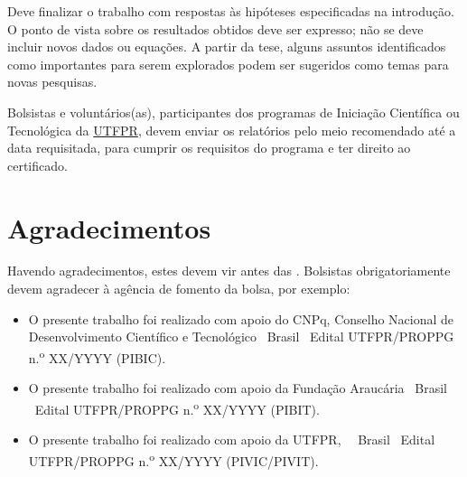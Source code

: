 \documentclass[%
  a4paper,%
  12pt,%
  fleqn,%
  english,%
  brazilian,%
]{article}
\begin{document}
Deve finalizar o trabalho com respostas às hipóteses especificadas na introdução.
O ponto de vista sobre os resultados obtidos deve ser expresso; não se deve incluir novos dados ou equações.
A partir da tese, alguns assuntos identificados como importantes para serem explorados podem ser sugeridos como temas para novas pesquisas.

Bolsistas e voluntários{(as)}, participantes dos programas de Iniciação Científica ou Tecnológica da \href{https://www.utfpr.edu.br/}{UTFPR\LinkIcon}, devem enviar os relatórios pelo meio recomendado até a data requisitada, para cumprir os requisitos do programa e ter direito ao certificado.

\section{Agradecimentos}%
\label{sect:ack}

Havendo agradecimentos, estes devem vir antes das .
Bolsistas obrigatoriamente devem agradecer à agência de fomento da bolsa, por exemplo:

\begin{itemize}
\item O presente trabalho foi realizado com apoio do CNPq, Conselho Nacional de Desenvolvimento Científico e Tecnológico \textemdash\ Brasil \textemdash\ Edital UTFPR/PROPPG n.\textsuperscript{o} XX/YYYY (PIBIC).
\item O presente trabalho foi realizado com apoio da Fundação Araucária \textemdash\ Brasil \textemdash\ Edital UTFPR/PROPPG n.\textsuperscript{o} XX/YYYY (PIBIT).
\item O presente trabalho foi realizado com apoio da UTFPR, \UTFPRName\ \textemdash\ Brasil \textemdash\ Edital UTFPR/PROPPG n.\textsuperscript{o} XX/YYYY (PIVIC/PIVIT).
\end{itemize}

\printbibliography%

\end{document}
